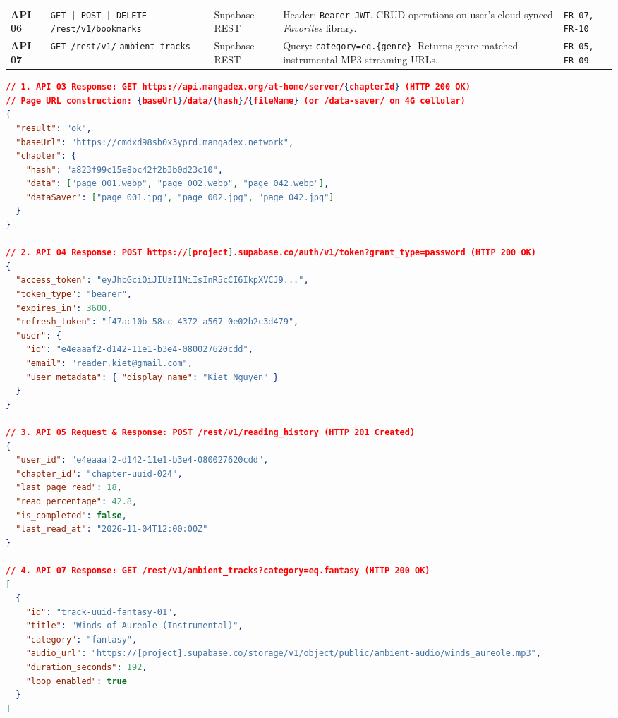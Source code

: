 \begin{table}[H]
\begin{tabularx}{\textwidth}{C{1.2cm} L{4.6cm} L{2.8cm} Y C{1.8cm}}
\textbf{API 06} & \texttt{GET | POST | DELETE} \allowbreak \texttt{/rest/v1/bookmarks} & Supabase REST & Header: \texttt{Bearer JWT}. CRUD operations on user's cloud-synced \textit{Favorites} library. & \texttt{FR-07, FR-10} \\
\textbf{API 07} & \texttt{GET /rest/v1/} \allowbreak \texttt{ambient\_tracks} & Supabase REST & Query: \texttt{category=eq.\{genre\}}. Returns genre-matched instrumental MP3 streaming URLs. & \texttt{FR-05, FR-09} \\
\bottomrule
\end{tabularx}
\end{table}

\begin{lstlisting}[language=json,caption={Representative Request/Response Schemas for API 03 (MangaDex@Home CDN), API 04 (Supabase Auth), API 05 (Reading Progress Upsert), and API 07 (Genre Ambient Audio).}]
// 1. API 03 Response: GET https://api.mangadex.org/at-home/server/{chapterId} (HTTP 200 OK)
// Page URL construction: {baseUrl}/data/{hash}/{fileName} (or /data-saver/ on 4G cellular)
{
  "result": "ok",
  "baseUrl": "https://cmdxd98sb0x3yprd.mangadex.network",
  "chapter": {
    "hash": "a823f99c15e8bc42f2b3b0d23c10",
    "data": ["page_001.webp", "page_002.webp", "page_042.webp"],
    "dataSaver": ["page_001.jpg", "page_002.jpg", "page_042.jpg"]
  }
}

// 2. API 04 Response: POST https://[project].supabase.co/auth/v1/token?grant_type=password (HTTP 200 OK)
{
  "access_token": "eyJhbGciOiJIUzI1NiIsInR5cCI6IkpXVCJ9...",
  "token_type": "bearer",
  "expires_in": 3600,
  "refresh_token": "f47ac10b-58cc-4372-a567-0e02b2c3d479",
  "user": {
    "id": "e4eaaaf2-d142-11e1-b3e4-080027620cdd",
    "email": "reader.kiet@gmail.com",
    "user_metadata": { "display_name": "Kiet Nguyen" }
  }
}

// 3. API 05 Request & Response: POST /rest/v1/reading_history (HTTP 201 Created)
{
  "user_id": "e4eaaaf2-d142-11e1-b3e4-080027620cdd",
  "chapter_id": "chapter-uuid-024",
  "last_page_read": 18,
  "read_percentage": 42.8,
  "is_completed": false,
  "last_read_at": "2026-11-04T12:00:00Z"
}

// 4. API 07 Response: GET /rest/v1/ambient_tracks?category=eq.fantasy (HTTP 200 OK)
[
  {
    "id": "track-uuid-fantasy-01",
    "title": "Winds of Aureole (Instrumental)",
    "category": "fantasy",
    "audio_url": "https://[project].supabase.co/storage/v1/object/public/ambient-audio/winds_aureole.mp3",
    "duration_seconds": 192,
    "loop_enabled": true
  }
]
\end{lstlisting}

